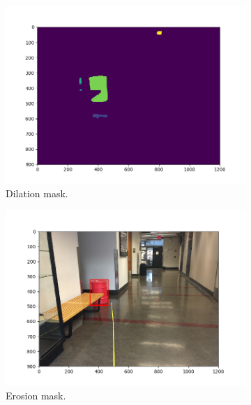 \documentclass[a4paper]{article}
\begin{document}
\begin{figure}[!tbp]
  \centering
  \begin{subfigure}[b]{.4\textwidth}
    \includegraphics[width=1.3\textwidth]{labeled_image.png}
\caption{\label{fig:dilate_mask}Dilation mask.}
  \end{subfigure}
  \begin{subfigure}[b]{.4\textwidth}
    \includegraphics[width=1.3\textwidth]{drawn_barrel.png}
\caption{\label{fig:erode_mask}Erosion mask.}
  \end{subfigure}
  \caption{\label{fig:fourth_set}}
\end{figure}
\end{document}
